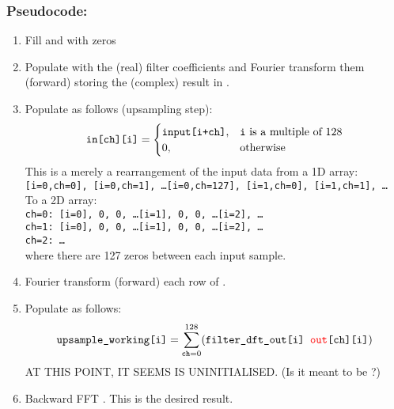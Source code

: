\documentclass{article}
\begin{document}
\subsubsection*{Pseudocode:}
\begin{enumerate}
    \item Fill  and  with zeros
    \item Populate  with the (real) filter coefficients and Fourier transform them (forward) storing the (complex) result in .
    \item Populate  as follows (upsampling step):
        \begin{equation}
            \texttt{in[ch][i]} =
            \begin{cases}
                \texttt{input[i+ch]}, & \text{\texttt{i} is a multiple of 128} \\
                0, & \text{otherwise}
            \end{cases}
        \end{equation}
        This is a merely a rearrangement of the input data from a 1D array:\\[8pt]
        \texttt{[i=0,ch=0], [i=0,ch=1], \dots [i=0,ch=127], [i=1,ch=0], [i=1,ch=1], \dots}\\[8pt]
        To a 2D array:\\[8pt]
        \texttt{ch=0: [i=0], 0, 0, \dots [i=1], 0, 0, \dots [i=2], \dots}\\
        \texttt{ch=1: [i=0], 0, 0, \dots [i=1], 0, 0, \dots [i=2], \dots}\\
        \texttt{ch=2: \dots}\\[8pt]
        where there are 127 zeros between each input sample.
    \item Fourier transform (forward) each row of .
    \item Populate  as follows:
        \begin{equation}
            \texttt{upsample\_working[i]}
              = \sum_{\texttt{ch}=0}^{128} (\texttt{filter\_dft\_out[i] {\color{red}out}[ch][i]})
        \end{equation}
        AT THIS POINT, IT SEEMS  IS UNINITIALISED. (Is it meant to be ?)
    \item Backward FFT . This is the desired result.
\end{enumerate}
\end{document}

